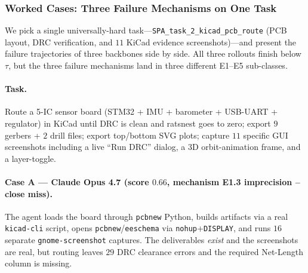 \documentclass{llmxive}
\begin{document}
\subsubsection{Worked Cases: Three Failure Mechanisms on One Task}
\label{app:failure-3way}

We pick a single universally-hard task---\texttt{SPA\_task\_2\_kicad\_pcb\_route} (PCB layout, DRC verification, and $11$ KiCad evidence screenshots)---and present the failure trajectories of three backbones side by side. All three rollouts finish below $\tau$, but the three failure mechanisms land in three different E1--E5 sub-classes.

\paragraph{Task.} Route a 5-IC sensor board (STM32 + IMU + barometer + USB-UART + regulator) in KiCad until DRC is clean and ratsnest goes to zero; export $9$ gerbers + $2$ drill files; export top/bottom SVG plots; capture $11$ specific GUI screenshots including a live ``Run DRC'' dialog, a 3D orbit-animation frame, and a layer-toggle.

\paragraph{Case A --- Claude Opus 4.7 (score \texorpdfstring{$0.66$}{0.66}, mechanism E1.3 imprecision -- close miss).} The agent loads the board through \texttt{pcbnew} Python, builds artifacts via a real \texttt{kicad-cli} script, opens \texttt{pcbnew}/\texttt{eeschema} via \texttt{nohup}+\texttt{DISPLAY}, and runs $16$ separate \texttt{gnome-screenshot} captures. The deliverables \emph{exist} and the screenshots are real, but routing leaves $29$ DRC clearance errors and the required Net-Length column is missing.
\end{document}
